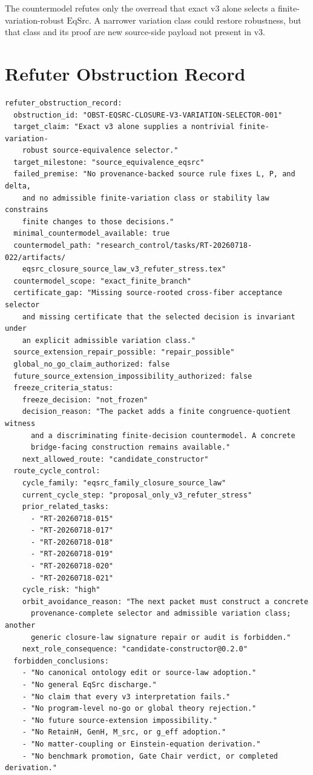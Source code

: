 \documentclass[11pt]{article}
\begin{document}
The countermodel refutes only the overread that exact v3 alone selects a
finite-variation-robust \(\mathrm{EqSrc}\). A narrower variation class could
restore robustness, but that class and its proof are new source-side payload
not present in v3.

\section{Refuter Obstruction Record}

\begin{verbatim}
refuter_obstruction_record:
  obstruction_id: "OBST-EQSRC-CLOSURE-V3-VARIATION-SELECTOR-001"
  target_claim: "Exact v3 alone supplies a nontrivial finite-variation-
    robust source-equivalence selector."
  target_milestone: "source_equivalence_eqsrc"
  failed_premise: "No provenance-backed source rule fixes L, P, and delta,
    and no admissible finite-variation class or stability law constrains
    finite changes to those decisions."
  minimal_countermodel_available: true
  countermodel_path: "research_control/tasks/RT-20260718-022/artifacts/
    eqsrc_closure_source_law_v3_refuter_stress.tex"
  countermodel_scope: "exact_finite_branch"
  certificate_gap: "Missing source-rooted cross-fiber acceptance selector
    and missing certificate that the selected decision is invariant under
    an explicit admissible variation class."
  source_extension_repair_possible: "repair_possible"
  global_no_go_claim_authorized: false
  future_source_extension_impossibility_authorized: false
  freeze_criteria_status:
    freeze_decision: "not_frozen"
    decision_reason: "The packet adds a finite congruence-quotient witness
      and a discriminating finite-decision countermodel. A concrete
      bridge-facing construction remains available."
    next_allowed_route: "candidate_constructor"
  route_cycle_control:
    cycle_family: "eqsrc_family_closure_source_law"
    current_cycle_step: "proposal_only_v3_refuter_stress"
    prior_related_tasks:
      - "RT-20260718-015"
      - "RT-20260718-017"
      - "RT-20260718-018"
      - "RT-20260718-019"
      - "RT-20260718-020"
      - "RT-20260718-021"
    cycle_risk: "high"
    orbit_avoidance_reason: "The next packet must construct a concrete
      provenance-complete selector and admissible variation class; another
      generic closure-law signature repair or audit is forbidden."
    next_role_consequence: "candidate-constructor@0.2.0"
  forbidden_conclusions:
    - "No canonical ontology edit or source-law adoption."
    - "No general EqSrc discharge."
    - "No claim that every v3 interpretation fails."
    - "No program-level no-go or global theory rejection."
    - "No future source-extension impossibility."
    - "No RetainH, GenH, M_src, or g_eff adoption."
    - "No matter-coupling or Einstein-equation derivation."
    - "No benchmark promotion, Gate Chair verdict, or completed derivation."
\end{verbatim}
\end{document}
